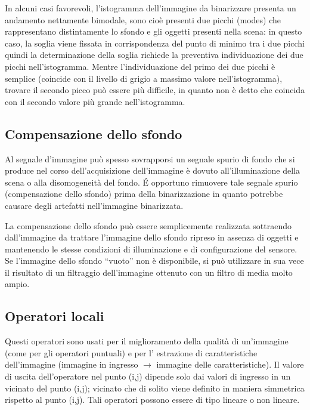 In alcuni casi favorevoli, l'istogramma  dell'immagine da binarizzare presenta
un  andamento nettamente bimodale, sono cioè presenti due picchi (modes) che
rappresentano distintamente lo sfondo e gli  oggetti presenti nella scena: in
questo caso, la soglia viene fissata in  corrispondenza del punto di minimo
tra i due  picchi quindi la determinazione della soglia richiede la
preventiva individuazione dei due picchi  nell'istogramma. Mentre
l'individuazione del primo dei due  picchi è semplice (coincide con il livello
di  grigio a massimo valore nell'istogramma),  trovare il secondo picco può
essere più  difficile, in quanto non è detto che coincida  con il secondo
valore più grande  nell'istogramma.

\subsection{Compensazione dello sfondo}

Al segnale d'immagine può spesso  sovrapporsi un segnale spurio di fondo che
si  produce nel corso dell'acquisizione  dell'immagine è dovuto
all'illuminazione della  scena o alla disomogeneità del fondo. \'{E} opportuno
rimuovere tale segnale spurio  (compensazione dello sfondo) prima della
binarizzazione in quanto potrebbe causare  degli artefatti nell'immagine
binarizzata.

La compensazione dello sfondo può essere  semplicemente realizzata
sottraendo  dall'immagine da trattare l'immagine dello  sfondo ripreso in
assenza di oggetti e  mantenendo le stesse condizioni di  illuminazione e di
configurazione del sensore. Se l'immagine dello sfondo ``vuoto'' non è
disponibile, si può utilizzare in sua vece il  risultato di un filtraggio
dell'immagine  ottenuto con un filtro di media molto ampio.

\subsection{Operatori locali}
Questi operatori sono usati per il miglioramento della qualità di un'immagine (come per gli 
operatori puntuali) e per l' estrazione di caratteristiche dell'immagine (immagine in 
ingresso $\to$ immagine delle caratteristiche).
Il valore di uscita dell'operatore nel punto (i,j) 
dipende solo dai valori di ingresso in un vicinato del 
punto (i,j); vicinato che di solito viene definito in maniera simmetrica 
rispetto al punto (i,j). Tali operatori possono essere di tipo lineare o non lineare.

